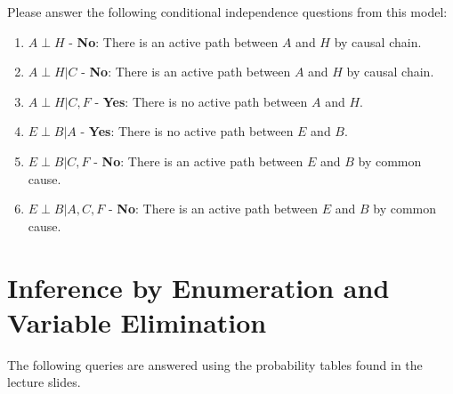 \documentclass[fleqn]{hw}
\newcommand{\indep}{\perp}
\begin{document}
Please answer the following conditional independence questions from
this model:

\begin{enumerate}
\item $A \indep H$ - {\bf No}: There is an active path between $A$ and $H$ by causal chain.
\item $A \indep H | C$ - {\bf No}: There is an active path between $A$ and $H$ by causal chain.
\item $A \indep H | C,F$ - {\bf Yes}: There is no active path between $A$ and $H$.
\item $E \indep B | A$ - {\bf Yes}: There is no active path between $E$ and $B$.
\item $E \indep B | C,F$ - {\bf No}: There is an active path between $E$ and $B$ by common cause. 
\item $E \indep B | A,C,F$ - {\bf No}: There is an active path between $E$ and $B$ by common cause.
\end{enumerate}

\newpage
\section{Inference by Enumeration and Variable Elimination}

The following queries are answered using the probability tables found in the lecture slides.
\end{document}

